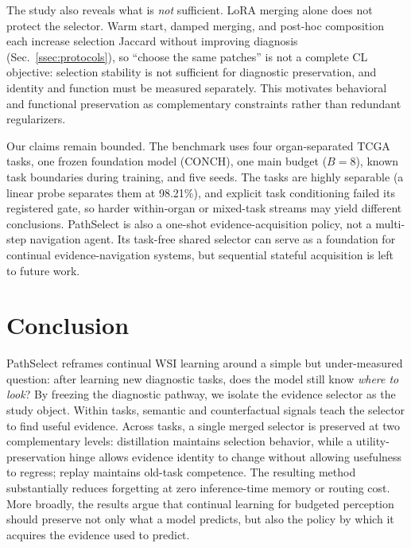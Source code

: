 \documentclass{article}
\begin{document}
The study also reveals what is \emph{not} sufficient.
LoRA merging alone does not protect the selector.
Warm start, damped merging, and post-hoc composition each increase selection Jaccard without improving diagnosis (Sec.~\ref{ssec:protocols}), so ``choose the same patches'' is not a complete CL objective: selection stability is not sufficient for diagnostic preservation, and identity and function must be measured separately.
This motivates behavioral and functional preservation as complementary constraints rather than redundant regularizers.

Our claims remain bounded.
The benchmark uses four organ-separated TCGA tasks, one frozen foundation model (CONCH), one main budget ($B=8$), known task boundaries during training, and five seeds.
The tasks are highly separable (a linear probe separates them at 98.21\%), and explicit task conditioning failed its registered gate, so harder within-organ or mixed-task streams may yield different conclusions.
PathSelect is also a one-shot evidence-acquisition policy, not a multi-step navigation agent.
Its task-free shared selector can serve as a foundation for continual evidence-navigation systems, but sequential stateful acquisition is left to future work.

\section{Conclusion}

PathSelect reframes continual WSI learning around a simple but under-measured question: after learning new diagnostic tasks, does the model still know \emph{where to look}?
By freezing the diagnostic pathway, we isolate the evidence selector as the study object.
Within tasks, semantic and counterfactual signals teach the selector to find useful evidence.
Across tasks, a single merged selector is preserved at two complementary levels: distillation maintains selection behavior, while a utility-preservation hinge allows evidence identity to change without allowing usefulness to regress; replay maintains old-task competence.
The resulting method substantially reduces forgetting at zero inference-time memory or routing cost.
More broadly, the results argue that continual learning for budgeted perception should preserve not only what a model predicts, but also the policy by which it acquires the evidence used to predict.



\end{document}
